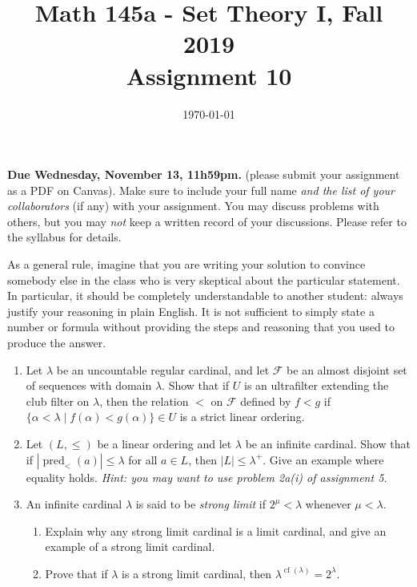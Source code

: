 \documentclass{amsart}
\title[Math 145a, Fall 2019: assignment 10]{Math 145a - Set Theory I, Fall 2019 \\ Assignment 10}
\date{\today}
\theoremstyle{definition}
\newcommand{\cf}[1]{\operatorname{cf}(#1)}
\newcommand{\pred}{\operatorname{pred}}
\newcommand{\Ff}{\mathcal{F}}
\begin{document}

\vspace*{-10em}

\maketitle

\textbf{Due Wednesday, November 13, 11h59pm.} (please submit your assignment as a PDF on Canvas). Make sure to include your full name \emph{and the list of your collaborators} (if any) with your assignment. You may discuss problems with others, but you may \emph{not} keep a written record of your discussions. Please refer to the syllabus for details.

As a general rule, imagine that you are writing your solution to convince somebody else in the class who is very skeptical about the particular statement. In particular, it should be completely understandable to another student: always justify your reasoning in plain English. It is not sufficient to simply state a number or formula without providing the steps and reasoning that you used to produce the answer.

\begin{enumerate}
\item Let $\lambda$ be an uncountable regular cardinal, and let $\Ff$ be an almost disjoint set of sequences with domain $\lambda$. Show that if $U$ is an ultrafilter extending the club filter on $\lambda$, then the relation $<$ on $\Ff$ defined by $f < g$ if $\{\alpha < \lambda \mid f (\alpha) < g (\alpha)\} \in U$ is a strict linear ordering.
\item Let $(L, \le)$ be a linear ordering and let $\lambda$ be an infinite cardinal. Show that if $|\pred_< (a)| \le \lambda$ for all $a \in L$, then $|L| \le \lambda^+$. Give an example where equality holds. \emph{Hint: you may want to use problem 2a(i) of assignment 5.}
\item An infinite cardinal $\lambda$ is said to be \emph{strong limit} if $2^\mu < \lambda$ whenever $\mu < \lambda$.
  \begin{enumerate}
  \item Explain why any strong limit cardinal is a limit cardinal, and give an example of a strong limit cardinal.
  \item Prove that if $\lambda$ is a strong limit cardinal, then $\lambda^{\cf{\lambda}} = 2^\lambda$.
  \end{enumerate}
\end{enumerate}
\end{document}
